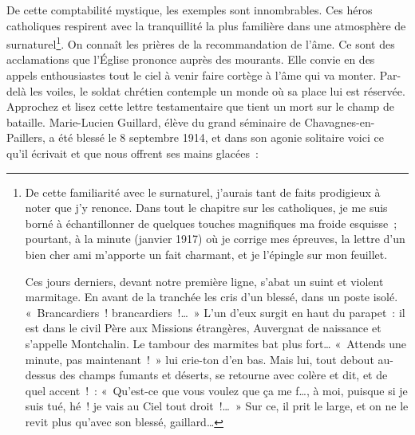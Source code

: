\documentclass[french,twoside]{book} %
\begin{document}
De cette comptabilité mystique, les exemples sont innombrables. Ces héros catholiques respirent avec la tranquillité la plus familière dans une atmosphère de surnaturel\footnote{ \par
 De cette familiarité avec le surnaturel, j’aurais tant de faits prodigieux à noter que j’y renonce. Dans tout le chapitre sur les catholiques, je me suis borné à échantillonner de quelques touches magnifiques ma froide esquisse ; pourtant, à la minute (janvier 1917) où je corrige mes épreuves, la lettre d’un bien cher ami m’apporte un fait charmant, et je l’épingle sur mon feuillet.‌\par
  \noindent Ces jours derniers, devant notre première ligne, s’abat un suint et violent marmitage. En avant de la tranchée les cris d’un blessé, dans un poste isolé. « Brancardiers ! brancardiers !… » L’un d’eux surgit en haut du parapet : il est dans le civil Père aux Missions étrangères, Auvergnat de naissance et s’appelle Montchalin. Le tambour des marmites bat plus fort… « Attends une minute, pas maintenant ! » lui crie-ton d’en bas. Mais lui, tout debout au-dessus des champs fumants et déserts, se retourne avec colère et dit, et de quel accent ! : « Qu’est-ce que vous voulez que ça me f…, à moi, puisque si je suis tué, hé ! je vais au Ciel tout droit !… » Sur ce, il prit le large, et on ne le revit plus qu’avec son blessé, gaillard…
 }. On connaît les prières de la recommandation de l’âme. Ce sont des acclamations que l’Église prononce auprès des mourants. Elle convie en des appels enthousiastes tout le ciel à venir faire cortège à l’âme qui va monter. Par-delà les voiles, le soldat chrétien contemple un monde où sa place lui est réservée. Approchez et lisez cette lettre testamentaire que tient un mort sur le champ de bataille. Marie-Lucien Guillard, élève du grand séminaire de Chavagnes-en-Paillers, a été blessé le 8 septembre 1914, et dans son agonie solitaire voici ce qu’il écrivait et que nous offrent ses mains glacées :‌\par
\end{document}
